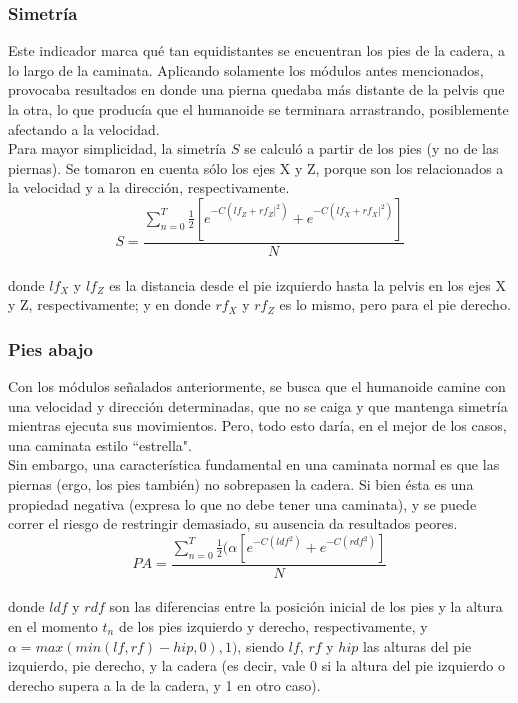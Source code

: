 \documentclass{article}
\begin{document}
\subsubsection{Simetr\'ia}
\label{simetria}
Este indicador marca qu\'e tan equidistantes se encuentran los pies de la cadera, a lo largo de la caminata. Aplicando solamente los m\'odulos antes mencionados, provocaba resultados en donde una pierna quedaba m\'as distante de la pelvis que la otra, lo que produc\'ia que el humanoide se terminara arrastrando, posiblemente afectando a la velocidad.\\
Para mayor simplicidad, la simetr\'ia $S$ se calcul\'o a partir de los pies (y no de las piernas). Se tomaron en cuenta s\'olo los ejes X y Z, porque son los relacionados a la velocidad y a la direcci\'on, respectivamente.
\begin{equation}
 S = \frac{\sum_{n=0}^{T} { \frac{1}{2} [e^{-C( lf_{Z} + rf_{Z}| ^2) } + e^{-C( lf_{X} + rf_{X}| ^2) }]  } } {N}
\end{equation}
\\ donde $lf_{X} $ y $lf_{Z} $ es la distancia desde el pie izquierdo hasta la pelvis en los ejes X y Z, respectivamente; y  en donde $rf_{X} $ y $rf_{Z} $ es lo mismo, pero para el pie derecho. 

\subsubsection{Pies abajo}
\label{piesabajo}
Con los m\'odulos se\~nalados anteriormente, se busca que el humanoide camine con una velocidad y direcci\'on determinadas, que no se caiga y que mantenga simetr\'ia mientras ejecuta sus movimientos. Pero, todo esto dar\'ia, en el mejor de los casos, una caminata estilo ``estrella". \\
Sin embargo, una caracter\'istica fundamental en una caminata normal es que las piernas (ergo, los pies tambi\'en) no sobrepasen la cadera. Si bien \'esta es una propiedad negativa (expresa lo que no debe tener una caminata), y se puede correr el riesgo de restringir demasiado, su ausencia da resultados peores.
\begin{equation}
 PA = \frac{\sum_{n=0}^{T} { \frac{1}{2} ( \alpha  [e^{-C( ldf ^2) } + e^{-C( rdf ^2) }]  } } {N}
\end{equation}
\\ donde $ldf $ y $rdf $ son las diferencias entre la posici\'on inicial de los pies y la altura en el momento $t_{n}$ de los pies izquierdo y derecho, respectivamente, y $\alpha = max(min(lf,rf)-hip,0),1)$, siendo $lf$, $rf$ y $hip$ las alturas del pie izquierdo, pie derecho, y la cadera (es decir, vale 0 si la altura del pie izquierdo o derecho supera a la de la cadera, y 1 en otro caso).\\
\end{document}
